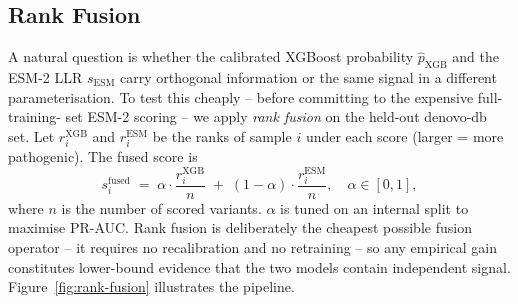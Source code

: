 \documentclass[11pt,a4paper,oneside]{report}
\begin{document}
\subsection{Rank Fusion}
\label{sec:arch-fusion}

A natural question is whether the calibrated XGBoost
probability $\hat p_{\text{XGB}}$ and the ESM-2 LLR
$s_{\text{ESM}}$ carry orthogonal information or the same
signal in a different parameterisation. To test this
cheaply -- before committing to the expensive full-training-
set ESM-2 scoring -- we apply \emph{rank fusion} on the
held-out denovo-db set. Let $r_i^{\text{XGB}}$ and
$r_i^{\text{ESM}}$ be the ranks of sample $i$ under each
score (larger = more pathogenic). The fused score is
\begin{equation}
  s_i^{\text{fused}} \;=\; \alpha \cdot \frac{r_i^{\text{XGB}}}{n}
                          \;+\; (1 - \alpha) \cdot \frac{r_i^{\text{ESM}}}{n},
  \quad \alpha \in [0, 1],
  \label{eq:rank-fusion}
\end{equation}
where $n$ is the number of scored variants. $\alpha$ is
tuned on an internal split to maximise PR-AUC. Rank fusion
is deliberately the cheapest possible fusion operator -- it
requires no recalibration and no retraining -- so any
empirical gain constitutes lower-bound evidence that the two
models contain independent signal.
Figure~\ref{fig:rank-fusion} illustrates the pipeline.
\end{document}
